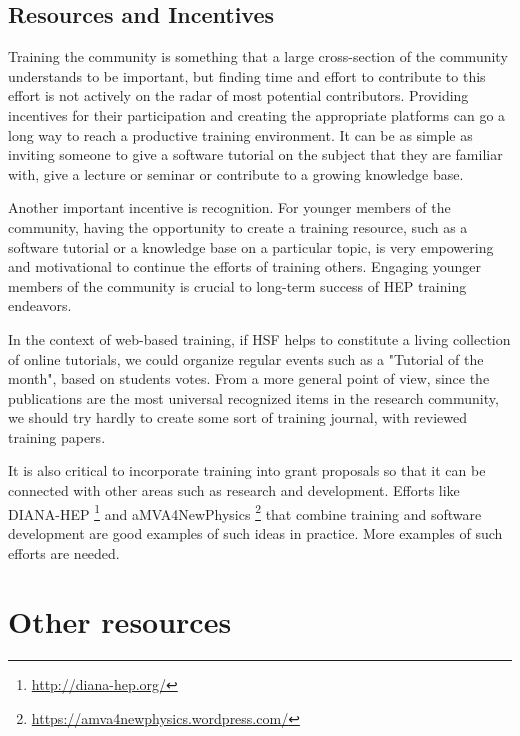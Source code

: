 \documentclass[12pt,a4paper]{article}
\begin{document}
\subsection{Resources and Incentives}

Training the community is something that a large cross-section of the community
understands to be important, but finding time and effort to contribute to this
effort is not actively on the radar of most potential contributors. Providing
incentives for their participation and creating the appropriate platforms can go
a long way to reach a productive training environment. It can be as simple as
inviting someone to give a software tutorial on the subject that they are
familiar with, give a lecture or seminar or contribute to a growing knowledge
base.

Another important incentive is recognition. For younger members of the
community, having the opportunity to create a training resource, such as a
software tutorial or a knowledge base on a particular topic, is very empowering
and motivational to continue the efforts of training others. Engaging younger
members of the community is crucial to long-term success of HEP training
endeavors.

In the context of web-based training, if HSF helps to constitute a living
collection of online tutorials, we could organize regular events such as
a "Tutorial of the month", based on students votes. From a more general point
of view, since the publications are the most universal recognized items
in the research community, we should try hardly to create some sort of
training journal, with reviewed training papers.

It is also critical to incorporate training into grant proposals so that it can
be connected with other areas such as research and development. Efforts like
DIANA-HEP \footnote{\url{http://diana-hep.org/}} and aMVA4NewPhysics
\footnote{\url{https://amva4newphysics.wordpress.com/}} that combine training
and software development are good examples of such ideas in practice. More
examples of such efforts are needed.


\section{Other resources}
\end{document}
